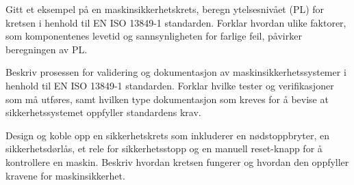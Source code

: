 \documentclass[12pt,a4paper]{article}
\def\oppgave{
		}
\begin{document}
\vskip 1cm
\oppgave{}%
\vskip 5pt 
Gitt et eksempel på en maskinsikkerhetskrets, beregn ytelsesnivået (PL) for kretsen i henhold til EN ISO 13849-1 standarden. Forklar hvordan ulike faktorer, som komponentenes levetid og sannsynligheten for farlige feil, påvirker beregningen av PL.
\vskip 1cm
\oppgave{}%
\vskip 5pt 
Beskriv prosessen for validering og dokumentasjon av maskinsikkerhetssystemer i henhold til EN ISO 13849-1 standarden. Forklar hvilke tester og verifikasjoner som må utføres, samt hvilken type dokumentasjon som kreves for å bevise at sikkerhetssystemet oppfyller standardens krav.
\vskip 1cm
\oppgave{}%
\vskip 5pt 
Design og koble opp en sikkerhetskrets som inkluderer en nødstoppbryter, en sikkerhetsdørlås, et rele for sikkerhetsstopp og en manuell reset-knapp for å kontrollere en maskin. Beskriv hvordan kretsen fungerer og hvordan den oppfyller kravene for maskinsikkerhet.
%
%
%
%
%
%
%
%
\vskip 1cm
\oppgave{}%
\vskip 5pt 
\vskip 1cm
\end{document}
